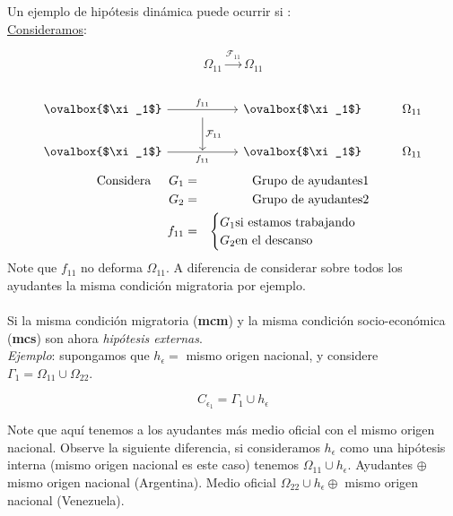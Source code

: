 \documentclass[]{article}
\begin{document}
Un ejemplo de hip\'otesis din\'amica puede ocurrir si :\\
\underline{Consideramos}:

\begin{equation}
\Omega_{11}\xrightarrow{\mathcal{F}_{11}} \Omega_{11}
\end{equation}
\\
\begin{equation*}
\begin{tikzcd}
\ovalbox{$\xi_1$}\arrow{rr}{f_{11}}&\arrow{d}{\mathcal{F}_{11}}&\ovalbox{$\xi_1$}&\Omega_{11}\\
\ovalbox{$\xi_1$}\arrow{rr}[swap]{f_{11}}&{}&\ovalbox{$\xi_1$}&\Omega_{11}
\end{tikzcd}
\end{equation*}
\begin{eqnarray*}
\text{Considera}\hspace{0.5cm}  G_{1}&=&\text{Grupo de ayudantes} 1\\
 								  G_{2}&=&\text{Grupo de ayudantes} 2\\
 								  f_{11}&=&\begin{cases}
 								  	G_1\text{si estamos trabajando}\\
 								  	G_2\text{en el descanso}
 								  \end{cases}
\end{eqnarray*}
Note que $f_{11}$ no deforma $\Omega_{11}$. A diferencia de considerar sobre todos los ayudantes la misma condici\'on migratoria por ejemplo. \\

\emph{\underline{}}\\

Si la misma condici\'on migratoria (\textbf{mcm}) y la misma condici\'on socio-econ\'omica (\textbf{mcs}) son ahora \emph{hip\'otesis externas}.\\

\emph{Ejemplo}: supongamos que $h_\epsilon=$ mismo origen nacional, y considere $\Gamma_1=\Omega_{11}\cup\Omega_{22}$.

\begin{equation}
C_{\epsilon_1}=\Gamma_1\cup h_\epsilon
\end{equation}

Note que aqu\'i tenemos a los ayudantes m\'as medio oficial con el mismo origen nacional. Observe la siguiente diferencia, si consideramos $h_\epsilon$ como una hip\'otesis interna (mismo origen nacional es este caso) tenemos $\Omega_{11}\cup h_\epsilon$. Ayudantes $\oplus$ mismo origen nacional (Argentina). Medio oficial $\Omega_{22}\cup h_\epsilon \oplus$ mismo origen nacional (Venezuela).\\
\end{document}
